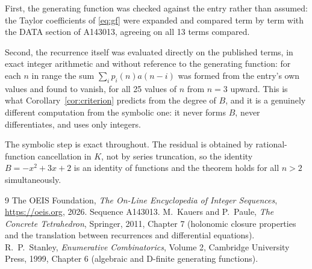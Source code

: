 \documentclass[11pt,a4paper]{article}
\theoremstyle{plain}
\theoremstyle{definition}
\begin{document}
First, the generating function was checked against the entry rather than assumed: the
Taylor coefficients of \eqref{eq:gf} were expanded and compared term by term with the DATA
section of A143013, agreeing on all 13 terms compared.

Second, the recurrence itself was evaluated directly on the published terms, in exact
integer arithmetic and without reference to the generating function: for each $n$ in range
the sum $\sum_{i}p_{i}(n)a(n-i)$ was formed from the entry's own values and found to
vanish, for all 25 values of $n$ from $n=3$ upward. This is what
Corollary~\ref{cor:criterion} predicts from the degree of $B$, and it is a genuinely
different computation from the symbolic one: it never forms $B$, never differentiates, and
uses only integers.

The symbolic step is exact throughout. The residual is obtained by rational-function
cancellation in $K$, not by series truncation, so the identity $B=- x^{2} + 3 x + 2$ is an
identity of functions and the theorem holds for all $n>2$ simultaneously.

\begin{thebibliography}{9}
 The OEIS Foundation, \emph{The On-Line Encyclopedia of Integer Sequences},
\url{https://oeis.org}, 2026. Sequence A143013.
 M.~Kauers and P.~Paule, \emph{The Concrete Tetrahedron}, Springer, 2011,
Chapter 7 (holonomic closure properties and the translation between recurrences and
differential equations).
 R.~P.~Stanley, \emph{Enumerative Combinatorics}, Volume 2, Cambridge
University Press, 1999, Chapter 6 (algebraic and D-finite generating functions).
\end{thebibliography}
\end{document}
